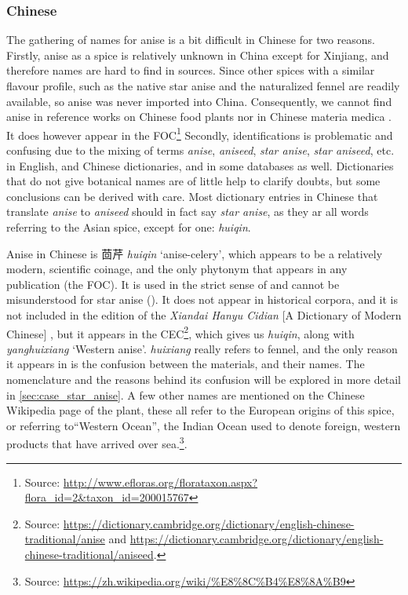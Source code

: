 \subsubsection{Chinese}





The gathering of names for anise is a bit difficult in Chinese for two reasons. Firstly, anise as a spice is relatively unknown in China except for Xinjiang, and therefore names are hard to find in sources. Since other spices with a similar flavour profile, such as the native star anise and the naturalized fennel are readily available, so anise was never imported into China. Consequently, we cannot find anise in reference works on Chinese food plants nor in Chinese \gls{materia medica} \autocite[see][]{hu_enumeration_1999, hu_food_2005}. It does however appear in the \gls{FOC}\footnote{Source: \url{http://www.efloras.org/florataxon.aspx?flora_id=2&taxon_id=200015767}} Secondly, identifications is problematic and confusing due to the mixing of terms \textit{anise}, \textit{aniseed}, \textit{star anise}, \textit{star aniseed}, etc. in English, and Chinese dictionaries, and in some databases as well. Dictionaries that do not give botanical names are of little help to clarify doubts, but some conclusions can be derived with care. Most dictionary entries in Chinese that translate \textit{anise} to \textit{aniseed} should in fact say \textit{star anise}, as they ar all words referring to the Asian spice, except for one:  \textit{huiqin}.

Anise in Chinese is 茴芹 \textit{huiqin} `anise-celery', which appears to be a relatively modern, scientific coinage, and the only \gls{phytonym} that appears in any publication (the \gls{FOC}). It is used in the strict sense of  and cannot be misunderstood for star anise (). It does not appear in historical corpora, and it is not included in the  edition of the \textit{Xiandai Hanyu Cidian} [A Dictionary of Modern Chinese] \autocite[]{chinese_academy_of_social_sciences_xiandai_2016}, but it appears in the \gls{CEC}\footnote{Source: \url{https://dictionary.cambridge.org/dictionary/english-chinese-traditional/anise} and \url{https://dictionary.cambridge.org/dictionary/english-chinese-traditional/aniseed}.}, which gives us \textit{huiqin}, along with  \textit{yanghuixiang} `Western anise'.  \textit{huixiang} really refers to fennel, and the only reason it appears in \textcite{kleeman_oxford_2010} is the confusion between the materials, and their names. The nomenclature and the reasons behind its confusion will be explored in more detail in \cref{sec:case_star_anise}. A few other names are mentioned on the Chinese Wikipedia page of the plant, these all refer to the European origins of this spice, or referring to``Western Ocean'', the Indian Ocean used to denote foreign, western products that have arrived over sea.\footnote{Source: \url{https://zh.wikipedia.org/wiki/\%E8\%8C\%B4\%E8\%8A\%B9}}. 

